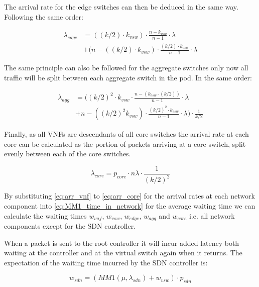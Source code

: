 The arrival rate for the edge switches can then be deduced in the same way. Following the same order:

\begin{equation}
\label{eq:arr_edge}
\begin{split}
\lambda_{edge} &= ((k/2) \cdot k_{vsw}) \cdot \frac{n - k_{vsw}}{n - 1} \cdot \lambda \\
			   &+ (n - ((k/2) \cdot k_{vsw}) \cdot \frac{(k/2) \cdot k_{vsw}}{n - 1} \cdot \lambda 
\end{split}
\end{equation}

The same principle can also be followed for the aggregate switches only now all traffic will be split between each aggregate switch in the pod. In the same order:

\begin{equation}
\label{eq:arr_agg}
\begin{split}
\lambda_{agg} &= \Big((k/2)^2 \cdot k_{vsw} \cdot \frac{n - (k_{vsw} \cdot (k/2))}{n - 1} \cdot \lambda\\
			  &+ n - ((k/2)^2 k_{vsw}) \cdot \frac{(k/2)^2 \cdot k_{vsw}}{n - 1} \cdot \lambda\Big) \cdot \frac{1}{k/2}
\end{split}
\end{equation}

Finally, as all VNFs are descendants of all core switches the arrival rate at each core can be calculated as the portion of packets arriving at a core switch, split evenly between each of the core switches.

\begin{equation}
\label{eq:arr_core}
\lambda_{core} = p_{core} \cdot n \lambda \cdot  \frac{1}{(k / 2)^2}
\end{equation}

By substituting \ref{eq:arr_vnf} to \ref{eq:arr_core} for the arrival rates at each network component into \ref{eq:MM1_time_in_network} for the average waiting time we can calculate the waiting times $w_{vnf}$, $w_{vsw}$, $w_{edge}$, $w_{agg}$ and $w_{core}$ i.e. all network components except for the SDN controller.

When a packet is sent to the root controller it will incur added latency both waiting at the controller and at the virtual switch again when it returns. The expectation of the waiting time incurred by the SDN controller is:

\begin{equation}
\label{eq:arr_sdn}
w_{sdn} = (MM1(\mu, \lambda_{sdn}) + w_{vsw}) \cdot p_{sdn}
\end{equation}

